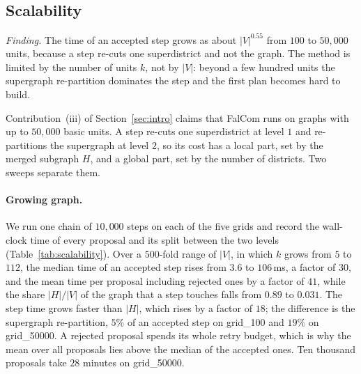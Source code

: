 \documentclass[11pt]{article}
\theoremstyle{definition}
\newcommand{\Pc}{\mathcal{P}}          %
\begin{document}
\subsection{Scalability}\label{sec:exp-scalability}

\emph{Finding.} The time of an accepted step grows as about $|V|^{0.55}$ from $100$ to $50{,}000$ units, because a step re-cuts one superdistrict and not the graph. The method is limited by the number of units $k$, not by $|V|$: beyond a few hundred units the supergraph re-partition dominates the step and the first plan becomes hard to build.

Contribution~(iii) of Section~\ref{sec:intro} claims that FalCom runs on graphs with up to $50{,}000$ basic units. A step re-cuts one superdistrict at level $1$ and re-partitions the supergraph at level $2$, so its cost has a local part, set by the merged subgraph $H$, and a global part, set by the number of districts. Two sweeps separate them.

\paragraph{Growing graph.}
We run one chain of $10{,}000$ steps on each of the five grids and record the wall-clock time of every proposal and its split between the two levels (Table~\ref{tab:scalability}). Over a $500$-fold range of $|V|$, in which $k$ grows from $5$ to $112$, the median time of an accepted step rises from $3.6$ to $106$\,ms, a factor of $30$, and the mean time per proposal including rejected ones by a factor of $41$, while the share $|H|/|V|$ of the graph that a step touches falls from $0.89$ to $0.031$. The step time grows faster than $|H|$, which rises by a factor of $18$; the difference is the supergraph re-partition, $5\%$ of an accepted step on grid\_100 and $19\%$ on grid\_50000. A rejected proposal spends its whole retry budget, which is why the mean over all proposals lies above the median of the accepted ones. Ten thousand proposals take $28$ minutes on grid\_50000.

\begin{table}[!htbp]
\centering
\footnotesize\setlength{\tabcolsep}{4pt}
\resizebox{\linewidth}{!}{}
\caption{Per-step cost on the five grids, one chain of $10{,}000$ steps each. $|\Pc^1|$ is the median number of districts and $|H|$ the number of nodes of the superdistrict that a step re-cuts. The median and the $95$th percentile are over accepted steps; ``mean proposal'' includes rejected ones. ``Supergraph share'' is the share of the time of accepted steps spent re-partitioning the supergraph.}
\label{tab:scalability}
\end{table}
\end{document}
